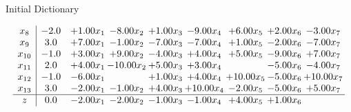\documentclass[8pt]{article}
\begin{document}
Initial Dictionary 

\[\begin{array}{c| c c@{\hskip 2pt} c@{\hskip 2pt} c@{\hskip 2pt} c@{\hskip 2pt} c@{\hskip 2pt} c@{\hskip 2pt} c@{\hskip 2pt} }
 x_{8}   &  -2.0 & +  1.00 x_{1} & -8.00 x_{2} & +  1.00 x_{3} & -9.00 x_{4} & +  6.00 x_{5} & +  2.00 x_{6} & -3.00 x_{7}\\
 x_{9}   &  3.0 & +  7.00 x_{1} & -1.00 x_{2} & -7.00 x_{3} & -7.00 x_{4} & +  1.00 x_{5} & -2.00 x_{6} & -7.00 x_{7}\\
 x_{10}   &  -1.0 & +  3.00 x_{1} & +  9.00 x_{2} & -4.00 x_{3} & +  4.00 x_{4} & +  5.00 x_{5} & -9.00 x_{6} & +  7.00 x_{7}\\
 x_{11}   &  2.0 & +  4.00 x_{1} & -10.00 x_{2} & +  5.00 x_{3} & +  3.00 x_{4} &   & -5.00 x_{6} & -4.00 x_{7}\\
 x_{12}   &  -1.0 & -6.00 x_{1} &   & +  1.00 x_{3} & +  4.00 x_{4} & + 10.00 x_{5} & -5.00 x_{6} & + 10.00 x_{7}\\
 x_{13}   &  3.0 & -2.00 x_{1} & -1.00 x_{2} & +  4.00 x_{3} & + 10.00 x_{4} & -2.00 x_{5} & -5.00 x_{6} & +  5.00 x_{7}\\
\hline
z    &  0.0 & -2.00 x_{1} & -2.00 x_{2} & -1.00 x_{3} & -1.00 x_{4} & +  4.00 x_{5} & +  1.00 x_{6} &   \\
\end{array}\]
\end{document}
